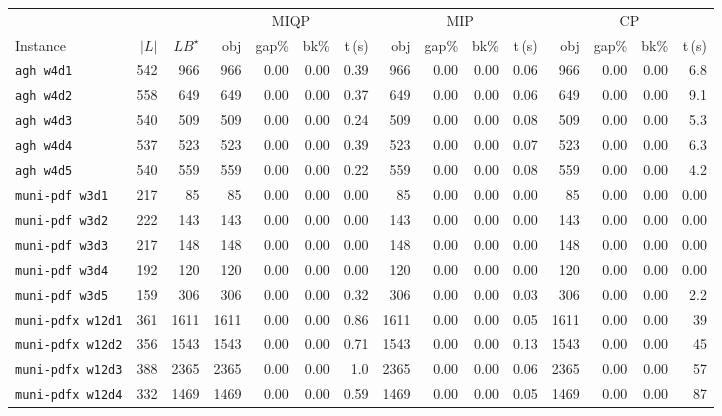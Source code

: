 \documentclass[11pt]{article}
\begin{document}
\begin{table}[ht]
\centering
\scriptsize
\setlength{\tabcolsep}{2pt}
\begin{tabular}{@{}lrr rrrr rrrr rrrr@{}}
\hline
 & & & \multicolumn{4}{c}{MIQP} & \multicolumn{4}{c}{MIP} & \multicolumn{4}{c}{CP} \\
Instance & $|L|$ & $LB^\star$ & obj & gap\% & bk\% & t\,(s) & obj & gap\% & bk\% & t\,(s) & obj & gap\% & bk\% & t\,(s) \\
\hline
\texttt{agh w4d1} & 542 & 966 & 966 & 0.00 & 0.00 & 0.39 & 966 & 0.00 & 0.00 & 0.06 & 966 & 0.00 & 0.00 & 6.8 \\
\texttt{agh w4d2} & 558 & 649 & 649 & 0.00 & 0.00 & 0.37 & 649 & 0.00 & 0.00 & 0.06 & 649 & 0.00 & 0.00 & 9.1 \\
\texttt{agh w4d3} & 540 & 509 & 509 & 0.00 & 0.00 & 0.24 & 509 & 0.00 & 0.00 & 0.08 & 509 & 0.00 & 0.00 & 5.3 \\
\texttt{agh w4d4} & 537 & 523 & 523 & 0.00 & 0.00 & 0.39 & 523 & 0.00 & 0.00 & 0.07 & 523 & 0.00 & 0.00 & 6.3 \\
\texttt{agh w4d5} & 540 & 559 & 559 & 0.00 & 0.00 & 0.22 & 559 & 0.00 & 0.00 & 0.08 & 559 & 0.00 & 0.00 & 4.2 \\
\texttt{muni-pdf w3d1} & 217 & 85 & 85 & 0.00 & 0.00 & 0.00 & 85 & 0.00 & 0.00 & 0.00 & 85 & 0.00 & 0.00 & 0.00 \\
\texttt{muni-pdf w3d2} & 222 & 143 & 143 & 0.00 & 0.00 & 0.00 & 143 & 0.00 & 0.00 & 0.00 & 143 & 0.00 & 0.00 & 0.00 \\
\texttt{muni-pdf w3d3} & 217 & 148 & 148 & 0.00 & 0.00 & 0.00 & 148 & 0.00 & 0.00 & 0.00 & 148 & 0.00 & 0.00 & 0.00 \\
\texttt{muni-pdf w3d4} & 192 & 120 & 120 & 0.00 & 0.00 & 0.00 & 120 & 0.00 & 0.00 & 0.00 & 120 & 0.00 & 0.00 & 0.00 \\
\texttt{muni-pdf w3d5} & 159 & 306 & 306 & 0.00 & 0.00 & 0.32 & 306 & 0.00 & 0.00 & 0.03 & 306 & 0.00 & 0.00 & 2.2 \\
\texttt{muni-pdfx w12d1} & 361 & 1611 & 1611 & 0.00 & 0.00 & 0.86 & 1611 & 0.00 & 0.00 & 0.05 & 1611 & 0.00 & 0.00 & 39 \\
\texttt{muni-pdfx w12d2} & 356 & 1543 & 1543 & 0.00 & 0.00 & 0.71 & 1543 & 0.00 & 0.00 & 0.13 & 1543 & 0.00 & 0.00 & 45 \\
\texttt{muni-pdfx w12d3} & 388 & 2365 & 2365 & 0.00 & 0.00 & 1.0 & 2365 & 0.00 & 0.00 & 0.06 & 2365 & 0.00 & 0.00 & 57 \\
\texttt{muni-pdfx w12d4} & 332 & 1469 & 1469 & 0.00 & 0.00 & 0.59 & 1469 & 0.00 & 0.00 & 0.05 & 1469 & 0.00 & 0.00 & 87 \\

\end{tabular}
\end{table}
\end{document}

